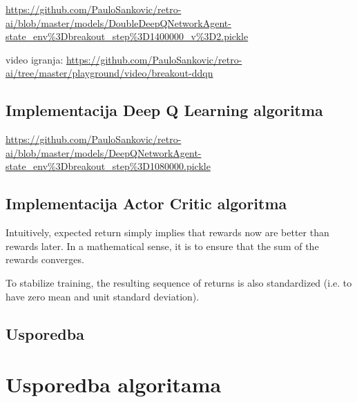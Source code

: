 \url{https://github.com/PauloSankovic/retro-ai/blob/master/models/DoubleDeepQNetworkAgent-state_env\%3Dbreakout_step\%3D1400000_v\%3D2.pickle}

video igranja:
\url{https://github.com/PauloSankovic/retro-ai/tree/master/playground/video/breakout-ddqn}

\subsection{Implementacija Deep Q Learning algoritma}

\url{https://github.com/PauloSankovic/retro-ai/blob/master/models/DeepQNetworkAgent-state_env\%3Dbreakout_step\%3D1080000.pickle}

\subsection{Implementacija Actor Critic algoritma}

Intuitively, expected return simply implies that rewards now are better than rewards later. In a mathematical sense, it is to ensure that the sum of the rewards converges.

To stabilize training, the resulting sequence of returns is also standardized (i.e. to have zero mean and unit standard deviation).

\subsection{Usporedba}

\section{Usporedba algoritama}

